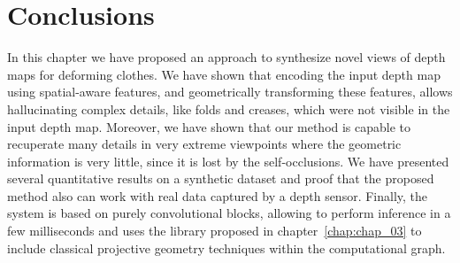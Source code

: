 \begin{table}[!tbh]
\begin{center}
\caption[Quantitative results under different network configurations]{{\bf Quantitative results under different network configurations.} The table shows the results in terms of \textit{Chamfer distance}   mean and standard deviation and the \textit{Cosine Distance}  between the normals maps for the Baseline and the model trained with and without the Adversarial loss. The evaluation has been done from -180 to 180 degrees of rotation.}
\label{table_ablation_study}
\end{center}
\end{table}

\section{Conclusions}

In this chapter we have proposed an approach to synthesize novel views of depth maps for deforming clothes. We have shown that encoding the input depth map using spatial-aware features, and geometrically transforming these features, allows hallucinating complex details, like folds and creases, which were not visible in the input depth map. Moreover, we have shown that our method is capable to recuperate many details in very extreme viewpoints where the geometric information is very little, since it is lost by the self-occlusions.
We have presented several quantitative results on a synthetic dataset and proof that the proposed method also can work with real data captured by a depth sensor. Finally, the system is based on purely convolutional blocks, allowing to perform inference in a few milliseconds and uses the library proposed in chapter~\ref{chap:chap_03} to include classical projective geometry techniques within the computational graph.